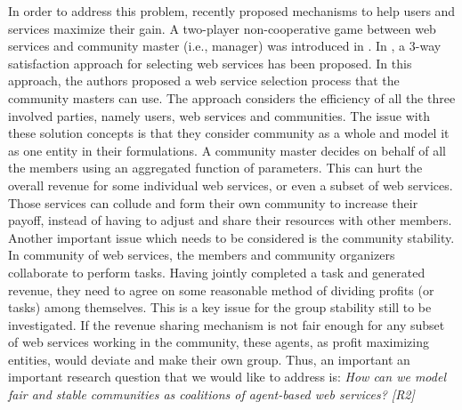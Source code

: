 In order to address this problem, recently
\cite{DBLP:conf/IEEEscc/LimTMB12,
DBLP:conf/IEEEscc/KhosravifarABT11, 10.1109/TSC.2012.12} proposed
mechanisms to help users and services maximize their gain. A
two-player non-cooperative game between web services and community master (i.e., manager) was introduced in
\cite{DBLP:conf/IEEEscc/KhosravifarABT11}. In
\cite{DBLP:conf/IEEEscc/LimTMB12}, a 3-way satisfaction approach
for selecting web services has been proposed. In this approach,
the authors proposed a web service selection process that the
community masters can use. The approach considers the efficiency
of all the three involved parties, namely users, web services and
communities. The issue with these solution concepts is that they
consider community as a whole and model it as one entity in their
formulations. A community master decides on behalf of all the
members using an aggregated function of parameters. This can hurt
the overall revenue for some individual web services, or even a
subset of web services. Those services can collude and form their
own community to increase their payoff, instead of having to adjust and share
their resources with other members. Another important issue which
needs to be considered is the community stability. In community of
web services, the members and community organizers collaborate to
perform tasks. Having jointly completed a task and generated
revenue, they need to agree on some reasonable method of dividing
profits (or tasks) among themselves. This is a key issue for the
group stability still to be investigated. If the revenue sharing
mechanism is not fair enough for any subset of web services
working in the community, these agents, as profit maximizing
entities, would deviate and make their own group. Thus, an important an
important research question that we would like to address is:
\emph{How can we model fair and stable communities as coalitions
of agent-based web services? [R2]}




